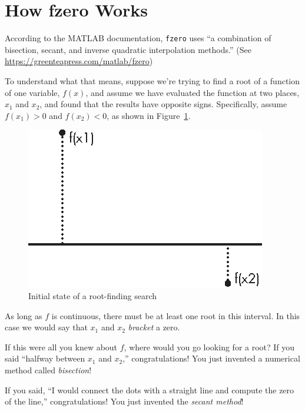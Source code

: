 \section{How fzero Works}
\label{howfzero}

According to the MATLAB documentation, \lstinline{fzero} uses ``a combination of bisection, secant, and inverse quadratic interpolation methods.''  (See \url{https://greenteapress.com/matlab/fzero})


To understand what that means, suppose we're trying to find a root of a function of one variable, $f(x)$, and assume we have evaluated the function at two places, $x_1$ and $x_2$, and found that the results have opposite signs.  Specifically, assume $f(x_1) > 0$ and $f(x_2) < 0$, as shown in Figure~\ref{fig:secant}.

\begin{figure}[h]
\centerline{\includegraphics[scale=0.8]{images/figure15_03_new.eps}}
\caption{Initial state of a root-finding search}
\label{fig:secant}
\end{figure}

As long as $f$ is continuous, there must be at least one root in this interval.
In this case we would say that $x_1$ and $x_2$ \emph{bracket} a zero.


If this were all you knew about $f$, where would you go looking for
a root?  If you said ``halfway between $x_1$ and $x_2$,''
congratulations!  You just invented a numerical method called
\emph{bisection}!

If you said, ``I would connect the dots with a straight line
and compute the zero of the line,''
congratulations!  You just invented the \emph{secant method}!

